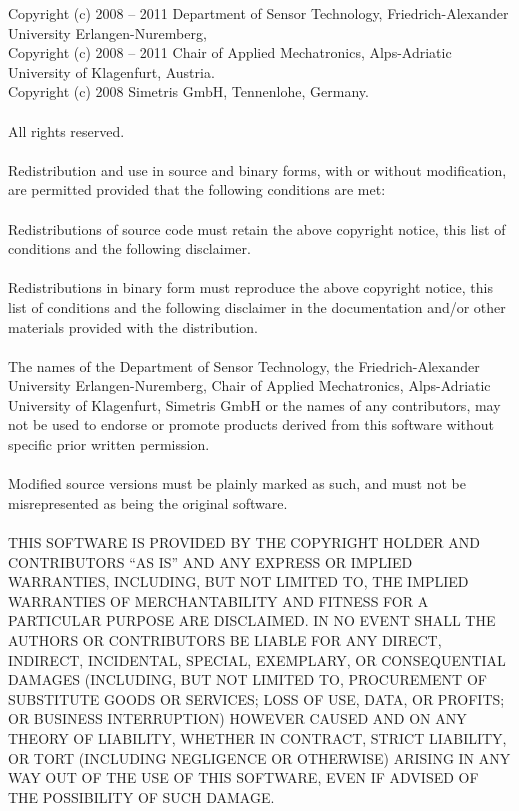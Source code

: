 \documentclass[a4paper,10pt]{article}
\begin{document}
Copyright (c) 2008 -- 2011 Department of Sensor Technology,
Friedrich-Alexander University Erlangen-Nuremberg,\\
Copyright (c) 2008 -- 2011 Chair of Applied Mechatronics,
Alps-Adriatic University of Klagenfurt, Austria.\\
Copyright (c) 2008 Simetris GmbH, Tennenlohe, Germany.\\\\
All rights reserved.\\\\
Redistribution and use in source and binary forms, with or without
modification, are permitted provided that the following conditions are met:\\\\
Redistributions of source code must retain the above copyright notice,
this list of conditions and the following disclaimer.\\\\
Redistributions in binary form must reproduce the above copyright notice,
this list of conditions and the following disclaimer in the documentation
and/or other materials provided with the distribution.\\\\
The names of the Department of Sensor Technology,
the Friedrich-Alexander University Erlangen-Nuremberg,
Chair of Applied Mechatronics, Alps-Adriatic University of Klagenfurt,
Simetris GmbH or the names of any contributors, may not be used to endorse or
promote products derived from this software without specific prior written
permission.\\\\
Modified source versions must be plainly marked as such, and must not be
misrepresented as being the original software.\\\\
THIS SOFTWARE IS PROVIDED BY THE COPYRIGHT HOLDER AND CONTRIBUTORS
``AS IS'' AND ANY EXPRESS OR IMPLIED WARRANTIES, INCLUDING, BUT NOT
LIMITED TO, THE IMPLIED WARRANTIES OF MERCHANTABILITY AND FITNESS FOR
A PARTICULAR PURPOSE ARE DISCLAIMED. IN NO EVENT SHALL THE AUTHORS OR
CONTRIBUTORS BE LIABLE FOR ANY DIRECT, INDIRECT, INCIDENTAL, SPECIAL,
EXEMPLARY, OR CONSEQUENTIAL DAMAGES (INCLUDING, BUT NOT LIMITED TO,
PROCUREMENT OF SUBSTITUTE GOODS OR SERVICES; LOSS OF USE, DATA, OR
PROFITS; OR BUSINESS INTERRUPTION) HOWEVER CAUSED AND ON ANY THEORY OF
LIABILITY, WHETHER IN CONTRACT, STRICT LIABILITY, OR TORT (INCLUDING
NEGLIGENCE OR OTHERWISE) ARISING IN ANY WAY OUT OF THE USE OF THIS
SOFTWARE, EVEN IF ADVISED OF THE POSSIBILITY OF SUCH DAMAGE.
\end{document}
